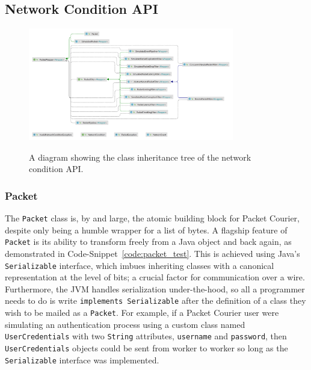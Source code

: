 \newpage

\subsection{Network Condition API}

\begin{figure}[!h]
    \includegraphics[width=0.8\textwidth]{images/chapter_4_implementation/network_condition_api_tree}
    \centering~\caption{A diagram showing the class inheritance tree of the network condition API.}
    \label{fig:chapter_4_implementation-network_condition_api_tree}
\end{figure}

\subsubsection{Packet}

The \texttt{Packet} class is, by and large, the atomic building block for Packet Courier, despite only being a humble
wrapper for a list of bytes. A flagship feature of \texttt{Packet} is its ability to transform freely from a Java
object and back again, as demonstrated in Code-Snippet~\ref{code:packet_test}. This is achieved using Java's
\texttt{Serializable} interface\cite{java_Serializable}, which imbues inheriting classes with a canonical
representation at the level of bits; a crucial factor for communication over a wire. Furthermore, the JVM handles
serialization under-the-hood, so all a programmer needs to do is write \texttt{implements Serializable} after the
definition of a class they wish to be mailed as a \texttt{Packet}. For example, if a Packet Courier user were
simulating an authentication process using a custom class named \texttt{UserCredentials} with two \texttt{String}
attributes, \texttt{username} and \texttt{password}, then \texttt{UserCredentials} objects could be sent from worker
to worker so long as the \texttt{Serializable} interface was implemented.

